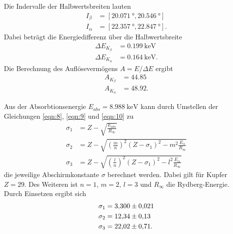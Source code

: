 \noindent
Die Indervalle der Halbwertsbreiten lauten 
\begin{align*}
    I_{\beta} &=[\SI{20.071}{\degree},\SI{20.546}{\degree}]\\
    I_{\alpha}&=[\SI{22.357}{\degree},\SI{22.847}{\degree}] .
\end{align*}
Dabei beträgt die Energiedifferenz über die Halbwertsbreite
\begin{align*}
    \Delta E_{K_\beta}  &= \SI{0.199}{\kilo\electronvolt}\\
    \Delta E_{K_\alpha} &= \SI{0.164}{\kilo\electronvolt}   .
\end{align*}
Die Berechnung des Auflösevermögens $A=E/\Delta E$ ergibt
\begin{align*}
    A_{K_\beta}  &= \num{44.85}\\
    A_{K_\alpha} &= \num{48.92} .
\end{align*}

Aus der Absorbtionsenergie $E_{abs}=\SI{8.988}{\kilo\electronvolt}$ \cite{AP04} kann durch Umstellen der Gleichungen \eqref{eqn:8}, \eqref{eqn:9}
und \eqref{eqn:10} zu
\begin{align*}
    \sigma_1&=Z-\sqrt{\frac{E_{abs}}{R_\infty}}\\
    \sigma_2&=Z-\sqrt{\left(\frac{m}{n}\right)^2(Z-\sigma_1)^2-m^2\frac{E_\alpha}{R_\infty}}\\
    \sigma_3&=Z-\sqrt{\left(\frac{l}{n}\right)^2(Z-\sigma_1)^2-l^2\frac{E_\alpha}{R_\infty}}
\end{align*}
die jeweilige Abschirmkonstante $\sigma$ berechnet werden. Dabei gilt für Kupfer $Z=\num{29}$. Des Weiteren ist $n=1$, $m=2$, $l=3$
und $R_\infty$ die Rydberg-Energie. Durch Einsetzen ergibt sich
\begin{align*}
    \sigma_1&=\num{3.30  \pm 0.021}\\
    \sigma_2&=\num{12.34 \pm 0.13 }\\
    \sigma_3&=\num{22.02 \pm 0.71 }   .
\end{align*}

